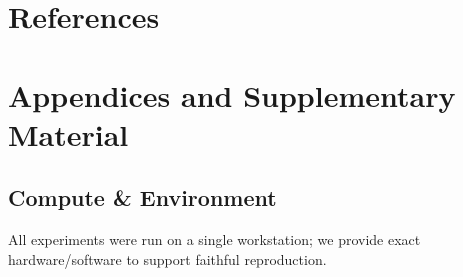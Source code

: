 \documentclass{article}
\begin{document}

\newpage

\section{References}




\newpage
\appendix

\section{Appendices and Supplementary Material}

\subsection{Compute \& Environment}
\label{sec:compute}
All experiments were run on a single workstation; we provide exact hardware/software to support faithful reproduction.
\end{document}
